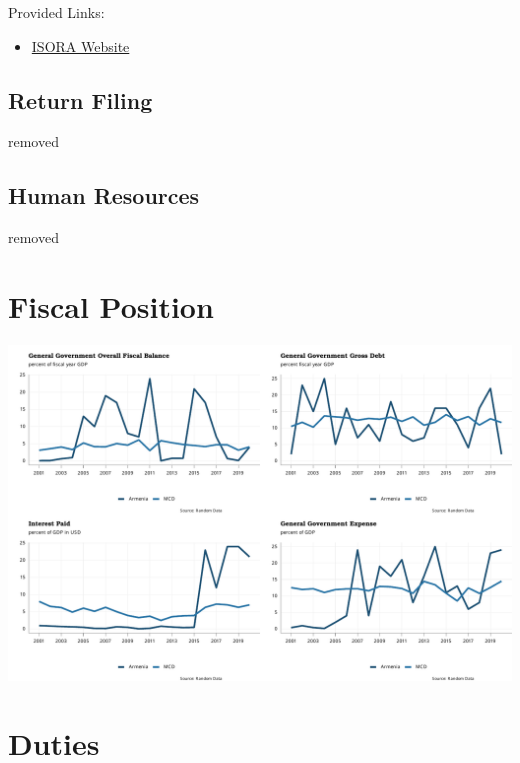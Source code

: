 \documentclass[
]{article}
\providecommand{\tightlist}{%
  \setlength{\itemsep}{0pt}\setlength{\parskip}{0pt}}
\begin{document}
Provided Links:

\begin{itemize}
\tightlist
\item
  \href{https://data.rafit.org/}{ISORA Website}
\end{itemize}

\hypertarget{return-filing}{%
\subsection{Return Filing}\label{return-filing}}

removed

\newpage

\hypertarget{human-resources}{%
\subsection{Human Resources}\label{human-resources}}

removed

\newpage

\hypertarget{fiscal-position}{%
\section{Fiscal Position}\label{fiscal-position}}

\begin{center}\includegraphics{RandomData_MCD__files/figure-latex/fiscal_position-1} \end{center}

\hypertarget{duties}{%
\section{Duties}\label{duties}}
\end{document}
